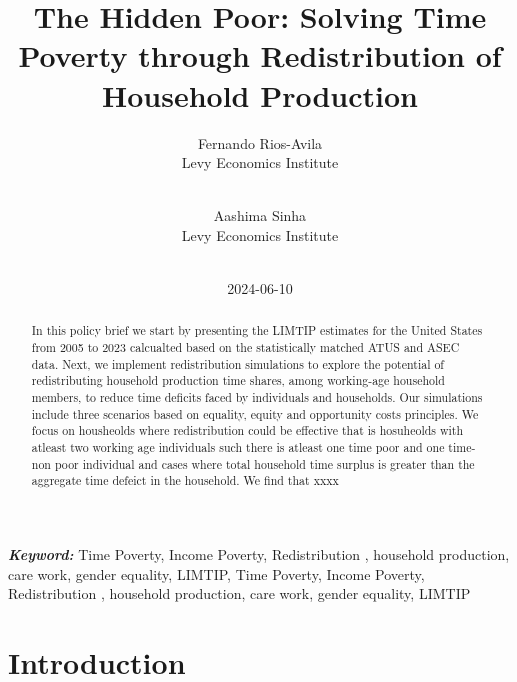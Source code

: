 \documentclass[
  11pt,
]{article}
\title{The Hidden Poor: Solving Time Poverty through Redistribution of
Household Production}
\author{
Fernando Rios-Avila\\
Levy Economics Institute\\
\\
\and 
Aashima Sinha\\
Levy Economics Institute\\
\\
}
\date{2024-06-10}
\begin{document}
\def\spacingset#1{\renewcommand{\baselinestretch}%
{#1}\small\normalsize} \spacingset{1}


\maketitle
\begin{abstract}
In this policy brief we start by presenting the LIMTIP estimates for the
United States from 2005 to 2023 calcualted based on the statistically
matched ATUS and ASEC data. Next, we implement redistribution
simulations to explore the potential of redistributing household
production time shares, among working-age household members, to reduce
time deficits faced by individuals and households. Our simulations
include three scenarios based on equality, equity and opportunity costs
principles. We focus on housheolds where redistribution could be
effective that is hosuheolds with atleast two working age individuals
such there is atleast one time poor and one time-non poor individual and
cases where total household time surplus is greater than the aggregate
time defeict in the household. We find that xxxx
\end{abstract}
 
\vspace{.2in}

\textbf{\textit{Keyword: }}
    Time Poverty, Income Poverty, Redistribution , household production,
care work, gender equality, LIMTIP, 
    Time Poverty, Income Poverty, Redistribution , household production,
care work, gender equality, LIMTIP 


\thispagestyle{empty}
\clearpage{}
\newpage
\spacingset{1.2} %
\section{Introduction}\label{introduction}
\end{document}
